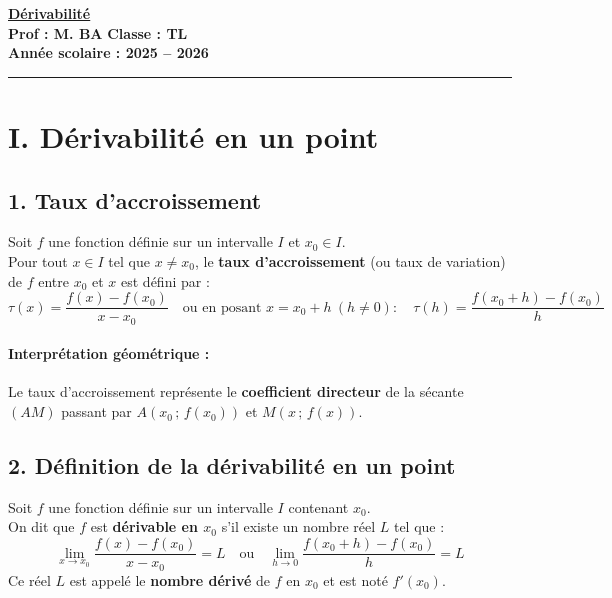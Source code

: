 \documentclass[12pt,a4paper]{article}
\begin{document}
\begin{center}
    \Large\textbf{\underline{\textcolor{myred}{Dérivabilité}}}\\[0.2cm]
    \normalsize\textbf{Prof : M. BA} \hfill \textbf{Classe : TL}\\[0.1cm]
    \textbf{Année scolaire : 2025 -- 2026}
\end{center}
\hrule
\vspace{0.5cm}


\section*{\color{myred}I. Dérivabilité en un point}

\subsection*{\color{myred}1. Taux d'accroissement}

\begin{tcolorbox}[colback=red!5!white,colframe=myred,title=\textbf{Définition : Taux d'accroissement}]
Soit $f$ une fonction définie sur un intervalle $I$ et $x_0 \in I$.\\
Pour tout $x \in I$ tel que $x \neq x_0$, le \textbf{taux d'accroissement} (ou taux de variation) de $f$ entre $x_0$ et $x$ est défini par :
\[
\tau(x) = \frac{f(x) - f(x_0)}{x - x_0} \quad \text{ou en posant } x = x_0 + h \ (h \neq 0) : \quad \tau(h) = \frac{f(x_0 + h) - f(x_0)}{h}
\]
\end{tcolorbox}

\paragraph{Interprétation géométrique :} 
Le taux d'accroissement représente le \textbf{coefficient directeur} de la sécante $(AM)$ passant par $A(x_0 \,;\, f(x_0))$ et $M(x \,;\, f(x))$.

\subsection*{\color{myred}2. Définition de la dérivabilité en un point}

\begin{tcolorbox}[colback=blue!5!white,colframe=myblue,title=\textbf{Définition : Nombre dérivé}]
Soit $f$ une fonction définie sur un intervalle $I$ contenant $x_0$.\\
On dit que $f$ est \textbf{dérivable en $x_0$} s'il existe un nombre réel $L$ tel que :
\[
\lim_{x \to x_0} \frac{f(x) - f(x_0)}{x - x_0} = L \quad \text{ou} \quad \lim_{h \to 0} \frac{f(x_0 + h) - f(x_0)}{h} = L
\]
Ce réel $L$ est appelé le \textbf{nombre dérivé} de $f$ en $x_0$ et est noté $f'(x_0)$.
\end{tcolorbox}
\end{document}
